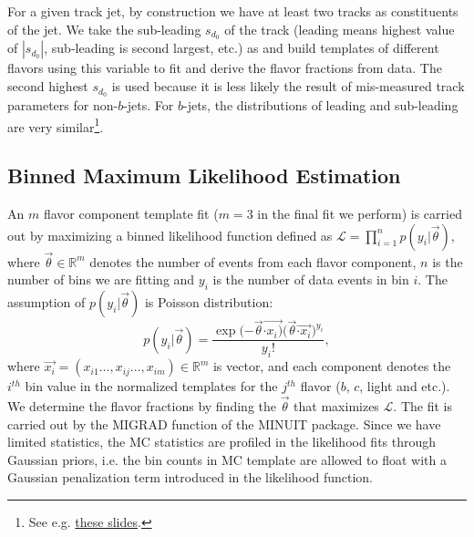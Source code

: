 For a given track jet, by construction we have at least two tracks as constituents of the jet. %
We take the sub-leading $s_{d_{0}}$ of the track (leading means highest value of $|s_{d_{0}}|$, sub-leading is second largest, etc.) as \subsdzero and build templates of different flavors using this variable to fit and derive the flavor fractions from data.   The second highest $s_{d_{0}}$ is used because it is less likely the result of mis-measured track parameters for non-$b$-jets.  For $b$-jets, the distributions of leading and sub-leading are very similar\footnote{See e.g. \href{https://indico.cern.ch/event/642521/contributions/2607425/subcontributions/230337/attachments/1517581/2369090/gbb_09_03_ZihaoJiang_Rel21Scrutiny.pdf}{these slides}.}. 





\subsection{Binned Maximum Likelihood Estimation}

An $m$ flavor component template fit ($m = 3$ in the final fit we perform) is carried out by maximizing a binned likelihood function defined as $\mathcal{L} = \prod _{i=1} ^n p(y_i| \vec{\theta})$, where $\vec{\theta} \in \mathbb{R}^m$ denotes the number of events from each flavor component, $n$ is the number of bins we are fitting and $y_i$ is the number of data events in bin $i$. The assumption of $p(y_i|\vec{\theta})$ is Poisson distribution: 
\begin{equation}
p(y_i|\vec{\theta}) = \frac{\exp{(-\vec{\theta} \vec{\cdot x_i)}} {(\vec{\theta}} \vec{\cdot x_i})^{y_i}}{y_i !}, 
\end{equation}
where $\vec{x_i}=(x_{i1}...,x_{ij}...,x_{im}) \in \mathbb{R}^m$ is vector, and each component denotes the $i^{th}$ bin value in the normalized templates for the $j^{th}$ flavor ($b$, $c$, light and etc.).   We determine the flavor fractions by finding the $\vec{\theta}$ that maximizes $\mathcal{L}$. The fit is carried out by the MIGRAD function of the MINUIT package. Since we have limited statistics, the MC statistics are profiled in the likelihood fits through Gaussian priors, i.e. the bin counts in MC template are allowed to float with a Gaussian penalization term introduced in the likelihood function.


